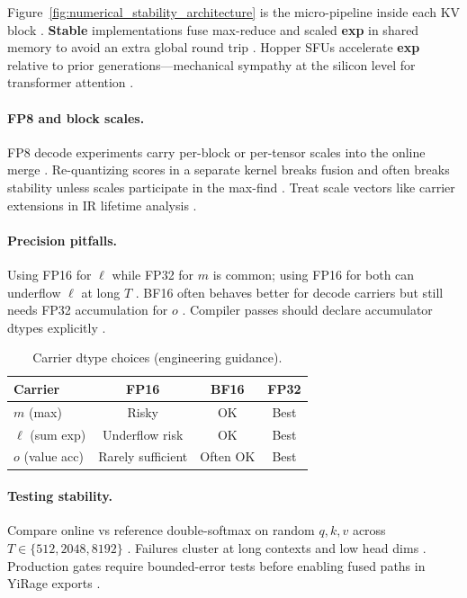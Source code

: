 Figure~\ref{fig:numerical_stability_architecture} is the micro-pipeline inside each KV block \citep{dao2022flashattention}. \textbf{Stable} implementations fuse max-reduce and scaled \textbf{exp} in shared memory to avoid an extra global round trip \citep{semianalysis2024tma,nvidia2022hopper}. Hopper SFUs accelerate \textbf{exp} relative to prior generations---mechanical sympathy at the silicon level for transformer attention \citep{nvidia2022hopper,patel2025llminference}.

\paragraph{FP8 and block scales.} FP8 decode experiments carry per-block or per-tensor scales into the online merge \citep{patel2025llminference,liu2024deepseekv3}. Re-quantizing scores in a separate kernel breaks fusion and often breaks stability unless scales participate in the max-find \citep{yirage2026,chen2020compilerbasedhardw}. Treat scale vectors like carrier extensions in IR lifetime analysis \citep{memoryfloor2026}.

\paragraph{Precision pitfalls.} Using FP16 for $\ell$ while FP32 for $m$ is common; using FP16 for both can underflow $\ell$ at long $T$ \citep{dao2022flashattention,patel2025llminference}. BF16 often behaves better for decode carriers but still needs FP32 accumulation for $o$ \citep{dlbook,yirage2026}. Compiler passes should declare accumulator dtypes explicitly \citep{chen2020compilerbasedhardw,yirage2026}.

\begin{table}[t]
\centering
\caption{Carrier dtype choices (engineering guidance).}
\label{tab:stability_dtypes}
\begin{tabular}{lccc}
\toprule
\textbf{Carrier} & \textbf{FP16} & \textbf{BF16} & \textbf{FP32} \\
\midrule
$m$ (max) & Risky & OK & Best \\
$\ell$ (sum exp) & Underflow risk & OK & Best \\
$o$ (value acc) & Rarely sufficient & Often OK & Best \\
\bottomrule
\end{tabular}
\end{table}

\paragraph{Testing stability.} Compare online vs reference double-softmax on random $q,k,v$ across $T\in\{512,2048,8192\}$ \citep{dao2023flashdecoding,kwon2023vllm}. Failures cluster at long contexts and low head dims \citep{patel2025llminference,dlbook}. Production gates require bounded-error tests before enabling fused paths in YiRage exports \citep{yirage2026,chen2020compilerbasedhardw}.

